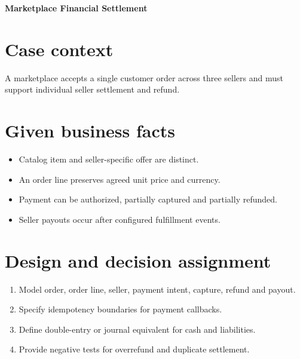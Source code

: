 \documentclass[11pt,letterpaper]{article}
\begin{document}
\begin{center}
{\LARGE\bfseries\color{navy} Marketplace Financial Settlement}\par
\vspace{0.25em}{\large Scenario-based enterprise case study}\par
{}
\end{center}
\vspace{0.8em}
\section{Case context}
A marketplace accepts a single customer order across three sellers and must support individual seller settlement and refund.


\section{Given business facts}
\begin{itemize}
\item Catalog item and seller-specific offer are distinct.
\item An order line preserves agreed unit price and currency.
\item Payment can be authorized, partially captured and partially refunded.
\item Seller payouts occur after configured fulfillment events.
\end{itemize}

\section{Design and decision assignment}
\begin{enumerate}
\item Model order, order line, seller, payment intent, capture, refund and payout.
\item Specify idempotency boundaries for payment callbacks.
\item Define double-entry or journal equivalent for cash and liabilities.
\item Provide negative tests for overrefund and duplicate settlement.
\end{enumerate}
\end{document}
